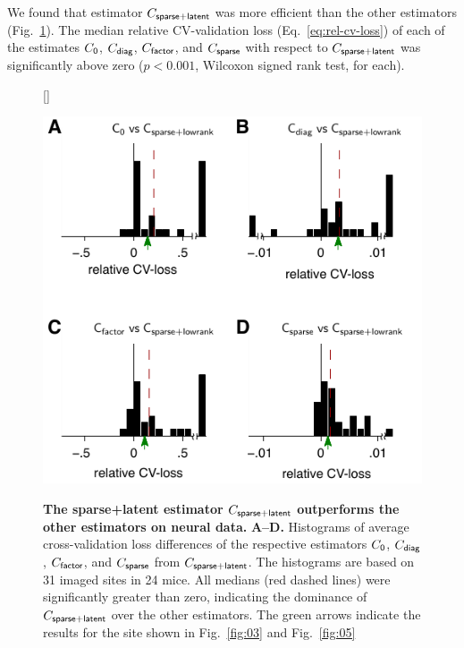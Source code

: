 \documentclass[10pt]{article}
\begin{document}
We found that estimator $C_{\sf sparse+latent}$ was more efficient than the other estimators (Fig.~\ref{fig:04}). The median relative CV-validation loss (Eq.~\ref{eq:rel-cv-loss}) of each of the estimates $C_{\sf 0}$, $C_{\sf diag}$, $C_{\sf factor}$, and $C_{\sf sparse}$ with respect to $C_{\sf sparse+latent}$ was significantly above zero ($p<0.001$, Wilcoxon signed rank test, for each).

\begin{figure}[!ht]
    [\FBwidth]
    {\caption{{\bf The sparse+latent estimator $C_{\sf sparse+latent}$ outperforms the other estimators on neural data.}
    {\bf A--D.} Histograms of average cross-validation loss differences of the respective estimators $C_{\sf 0}$, $C_{\sf diag}$, $C_{\sf factor}$, and $C_{\sf sparse}$ from $C_{\sf sparse+latent}$. 
    The histograms are based on 31 imaged sites in 24 mice. 
    All medians (red dashed lines) were significantly greater than zero, indicating the dominance of $C_{\sf sparse+latent}$ over the other estimators. 
    The green arrows indicate the results for the site shown in Fig.~\ref{fig:03} and Fig.~\ref{fig:05}
    } \label{fig:04}}
    {\includegraphics{./figures/Figure04.pdf}}
\end{figure}
\end{document}
